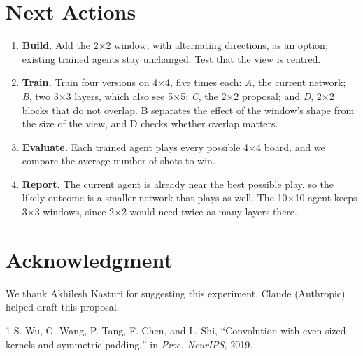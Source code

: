 \documentclass[conference,10pt]{IEEEtran}
\begin{document}
\section{Next Actions}
\begin{enumerate}
\item \textbf{Build.} Add the 2$\times$2 window, with alternating directions, as
an option; existing trained agents stay unchanged. Test that the view is
centred.
\item \textbf{Train.} Train four versions on 4$\times$4, five times each:
\emph{A}, the current network; \emph{B}, two 3$\times$3 layers, which also
see 5$\times$5; \emph{C}, the 2$\times$2 proposal; and \emph{D}, 2$\times$2
blocks that do not overlap. B separates the effect of the window's shape from
the size of the view, and D checks whether overlap matters.
\item \textbf{Evaluate.} Each trained agent plays every possible 4$\times$4
board, and we compare the average number of shots to win.
\item \textbf{Report.} The current agent is already near the best possible
play, so the likely outcome is a smaller network that plays as well. The
10$\times$10 agent keeps 3$\times$3 windows, since 2$\times$2 would need twice
as many layers there.
\end{enumerate}

\section*{Acknowledgment}
We thank Akhilesh Kasturi for suggesting this experiment. Claude (Anthropic)
helped draft this proposal.

\begin{thebibliography}{1}
 S. Wu, G. Wang, P. Tang, F. Chen, and L. Shi,
``Convolution with even-sized kernels and symmetric padding,'' in \emph{Proc.
NeurIPS}, 2019.
\end{thebibliography}
\end{document}
